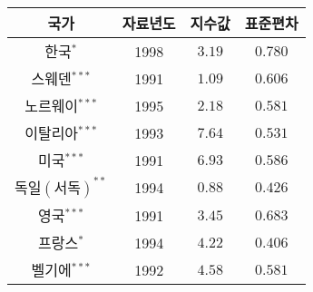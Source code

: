 \begin{tabular}{c|c|c|c}
\hline 국가 & 자료년도 & 지수값 & 표준편차 \\
\hline 한국$^{*}$ & 1998 & $3.19$ & $0.780$ \\
\hline 스웨덴$^{***}$ & 1991 & $1.09$ & $0.606$ \\
\hline 노르웨이$^{***}$ & 1995 & $2.18$ & $0.581$ \\
\hline 이탈리아$^{***}$ & 1993 & $7.64$ & $0.531$ \\
\hline 미국$^{***}$ & 1991 & $6.93$ & $0.586$ \\
\hline 독일$(서독)^{**}$ & 1994 & $0.88$ & $0.426$ \\
\hline 영국$^{***}$ & 1991 & $3.45$ & $0.683$ \\
\hline 프랑스$^{*}$ & 1994 & $4.22$ & $0.406$ \\
\hline 벨기에$^{***}$ & 1992 & $4.58$ & $0.581$ \\
\hline
\end{tabular}